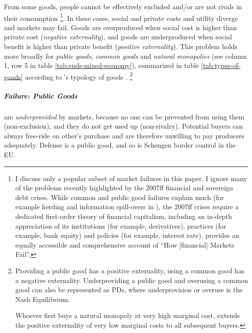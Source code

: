 From some goods, people cannot be effectively excluded and/or are not rivals in their consumption
\footnote{
	I discuss only a popular subset of market failures in this paper.
	I ignore many of the problems recently highlighted by the 2007ff financial and sovereign debt crises.
	While common and public good failures explain much (for example herding and information spill-overs in \citealt{Banerjee-1992-aa}), the 2007ff crises require a dedicated first-order theory of financial capitalism, including an in-depth appreciation of its institutions (for example, derivatives), practices (for example, bank equity) and policies (for example, interest rate).
	\cite{Cassidy2010} provides an equally accessible and comprehensive account of ``How [financial] Markets Fail''.}.
In these cases, social and private costs and utility diverge and markets may fail.
Goods are overproduced when social cost is higher than private cost (\emph{negative externality}), and goods are underproduced when social benefit is higher than private benefit (\emph{positive externality}).
This problem holds more broadly for \emph{public goods}, \emph{common goods} and \emph{natural monopolies} (see column 1, row 5 in table \ref{tab:ends-mixed-economy}), summarized in table \ref{tab:types-of-goods} according to \citeauthor{Samuelson-1954-eu}'s typology of goods \citeyearpar{Samuelson-1954-eu}.
\footnote{
	Providing a public good has a positive externality, using a common good has a negative externality.
	Underproviding a public good and overusing a common good can also be represented as \glspl{PD}, where underprovision or overuse is the Nash Equilibrium.

	Whoever first buys a natural monopoly at very high marginal cost, extends the positive externality of very low marginal costs to all subsequent buyers.
}



\subparagraph{Failure: Public Goods}  \label{sec:public-good} are \emph{underprovided} by markets, because no one can be prevented from using them (non-exclusion), and they do not get used up (non-rivalry). Potential buyers can always free-ride on other's purchase and are therefore unwilling to pay producers adequately. Defense is a public good, and so is Schengen border control in the \gls{EU}.

